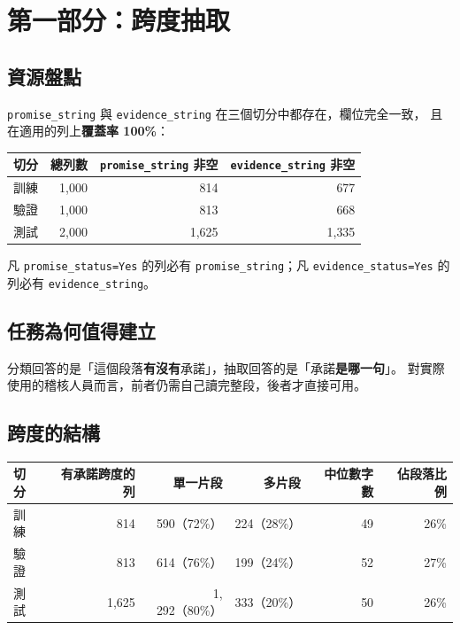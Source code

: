 \documentclass[11pt,a4paper]{ctexart}
\newcommand{\fn}[1]{\texttt{#1}}
\begin{document}
\section{第一部分：跨度抽取}

\subsection{資源盤點}

\fn{promise\_string} 與 \fn{evidence\_string} 在三個切分中都存在，欄位完全一致，
且在適用的列上\textbf{覆蓋率 100\%}：

\begin{table}[h]
\centering\small
\begin{tabular}{@{}lrrr@{}}
\toprule
切分 & 總列數 & \fn{promise\_string} 非空 & \fn{evidence\_string} 非空 \\
\midrule
訓練 & 1{,}000 & 814 & 677 \\
驗證 & 1{,}000 & 813 & 668 \\
測試 & 2{,}000 & 1{,}625 & 1{,}335 \\
\bottomrule
\end{tabular}
\end{table}

凡 \fn{promise\_status=Yes} 的列必有 \fn{promise\_string}；凡 \fn{evidence\_status=Yes}
的列必有 \fn{evidence\_string}。

\subsection{任務為何值得建立}

分類回答的是「這個段落\textbf{有沒有}承諾」，抽取回答的是「承諾\textbf{是哪一句}」。
對實際使用的稽核人員而言，前者仍需自己讀完整段，後者才直接可用。

\subsection{跨度的結構}

\begin{table}[h]
\centering\small
\begin{tabular}{@{}lrrrrr@{}}
\toprule
切分 & 有承諾跨度的列 & 單一片段 & 多片段 & 中位數字數 & 佔段落比例 \\
\midrule
訓練 & 814 & 590（72\%） & 224（28\%） & 49 & 26\% \\
驗證 & 813 & 614（76\%） & 199（24\%） & 52 & 27\% \\
測試 & 1{,}625 & 1{,}292（80\%） & 333（20\%） & 50 & 26\% \\
\bottomrule
\end{tabular}
\end{table}
\end{document}
